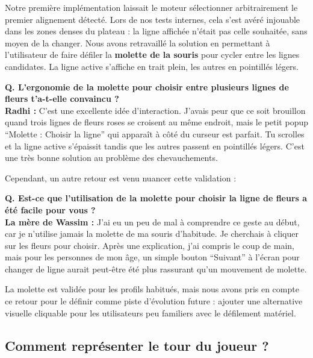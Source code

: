 \documentclass[11pt,a4paper]{article}
\begin{document}
Notre première implémentation laissait le moteur sélectionner arbitrairement le premier alignement détecté. Lors de nos tests internes, cela s'est avéré injouable dans les zones denses du plateau : la ligne affichée n'était pas celle souhaitée, sans moyen de la changer. Nous avons retravaillé la solution en permettant à l'utilisateur de faire défiler la \textbf{molette de la souris} pour cycler entre les lignes candidates. La ligne active s'affiche en trait plein, les autres en pointillés légers.

\begin{tcolorbox}[gamerbox, title={Radhi -- 23 ans, développeur amateur et joueur de jeux de plateau}]
    \textbf{Q. L'ergonomie de la molette pour choisir entre plusieurs lignes de fleurs t'a-t-elle convaincu ?}\\
    \textbf{Radhi :} C'est une excellente idée d'interaction. J'avais peur que ce soit brouillon quand trois lignes de fleurs roses se croisent au même endroit, mais le petit popup ``Molette : Choisir la ligne'' qui apparaît à côté du curseur est parfait. Tu scrolles et la ligne active s'épaissit tandis que les autres passent en pointillés légers. C'est une très bonne solution au problème des chevauchements.
\end{tcolorbox}

Cependant, un autre retour est venu nuancer cette validation :

\begin{tcolorbox}[seniorbox, title={La mère de Wassim -- 70 ans, retraitée de la fonction publique}]
    \textbf{Q. Est-ce que l'utilisation de la molette pour choisir la ligne de fleurs a été facile pour vous ?}\\
    \textbf{La mère de Wassim :} J'ai eu un peu de mal à comprendre ce geste au début, car je n'utilise jamais la molette de ma souris d'habitude. Je cherchais à cliquer sur les fleurs pour choisir. Après une explication, j'ai compris le coup de main, mais pour les personnes de mon âge, un simple bouton ``Suivant'' à l'écran pour changer de ligne aurait peut-être été plus rassurant qu'un mouvement de molette.
\end{tcolorbox}

La molette est validée pour les profils habitués, mais nous avons pris en compte ce retour pour le définir comme piste d'évolution future : ajouter une alternative visuelle cliquable pour les utilisateurs peu familiers avec le défilement matériel.

\subsection{Comment représenter le tour du joueur ?}
\end{document}
